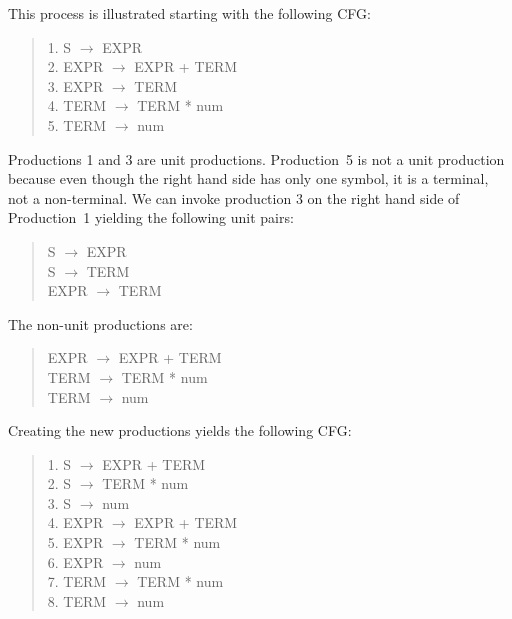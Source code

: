 \documentclass[letterpaper,12pt,openany,reqno]{book}%
\begin{document}
This process is illustrated starting with the following CFG:
\begin{quote}
{1. \ttfamily S} $\rightarrow$ {\ttfamily EXPR}\\
{2. \ttfamily EXPR} $\rightarrow$ {\ttfamily EXPR + TERM}\\
{3. \ttfamily EXPR} $\rightarrow$ {\ttfamily TERM}\\
{4. \ttfamily TERM} $\rightarrow$ {\ttfamily TERM * num}\\
{5. \ttfamily TERM} $\rightarrow$ {\ttfamily num}\\
\end{quote}
Productions 1 and 3 are unit productions. Production~5 is not a unit production because even though the right hand side has only one symbol, it is a terminal, not a non-terminal. We can invoke production 3 on the right hand side of Production~1 yielding the following unit pairs:
\begin{quote}
{\ttfamily S} $\rightarrow$ {\ttfamily EXPR}\\
{\ttfamily S} $\rightarrow$ {\ttfamily TERM}\\
{\ttfamily EXPR} $\rightarrow$ {\ttfamily TERM}\\
\end{quote}
The non-unit productions are:
\begin{quote}
{\ttfamily EXPR} $\rightarrow$ {\ttfamily EXPR + TERM}\\
{\ttfamily TERM} $\rightarrow$ {\ttfamily TERM * num}\\
{\ttfamily TERM} $\rightarrow$ {\ttfamily num}\\
\end{quote}
Creating the new productions yields the following CFG:
\begin{quote}
{1. \ttfamily S} $\rightarrow$ {\ttfamily EXPR + TERM}\\
{2. \ttfamily S} $\rightarrow$ {\ttfamily TERM * num}\\
{3. \ttfamily S} $\rightarrow$ {\ttfamily num}\\
{4. \ttfamily EXPR} $\rightarrow$ {\ttfamily EXPR + TERM}\\
{5. \ttfamily EXPR} $\rightarrow$ {\ttfamily TERM * num}\\
{6. \ttfamily EXPR} $\rightarrow$ {\ttfamily num}\\
{7. \ttfamily TERM} $\rightarrow$ {\ttfamily TERM * num}\\
{8. \ttfamily TERM} $\rightarrow$ {\ttfamily num}\\
\end{quote}
\end{document}

